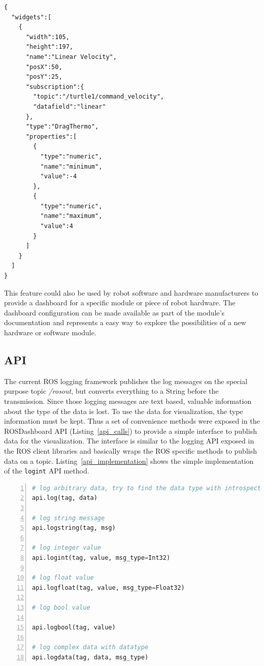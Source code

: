 \begin{lstlisting}[frame=single,caption={Example dashboard configuration in JSON.},label=json_example]
{
  "widgets":[
    {
      "width":105,
      "height":197,
      "name":"Linear Velocity",
      "posX":50,
      "posY":25,
      "subscription":{
        "topic":"/turtle1/command_velocity",
        "datafield":"linear"
      },
      "type":"DragThermo",
      "properties":[
        {
          "type":"numeric",
          "name":"minimum",
          "value":-4
        },
        {
          "type":"numeric",
          "name":"maximum",
          "value":4
        }
      ]
    }
  ]
}
\end{lstlisting}

This feature could also be used by robot software and hardware manufacturers to provide a dashboard for a specific module or piece of robot hardware. The dashboard configuration can be made available as part of the module's documentation and represents a easy way to explore the possibilities of a new hardware or software module.


\subsection{API}
\label{api_section}
The current ROS logging framework publishes the log messages on the special purpose topic \emph{/rosout}, but converts everything to a String before the transmission. Since those logging messages are text based, valuable information about the type of the data is lost. To use the data for visualization, the type information must be kept. Thus a set of convenience methods were exposed in the ROSDashboard API (Listing~\ref{api_calls}) to provide a simple interface to publish data for the visualization. The interface is similar to the logging API exposed in the ROS client libraries and basically wraps the ROS specific methods to publish data on a topic. Listing~\ref{api_implementation} shows the simple implementation of the \verb+logint+ API method.

\begin{lstlisting}[frame=single,caption={ROSDashboard API methods.},label=api_calls,language=Python,numbers=left,breaklines=true]
# log arbitrary data, try to find the data type with introspection
api.log(tag, data)

# log string message
api.logstring(tag, msg)

# log integer value
api.logint(tag, value, msg_type=Int32)

# log float value
api.logfloat(tag, value, msg_type=Float32)

# log bool value

api.logbool(tag, value)

# log complex data with datatype
api.logdata(tag, data, msg_type)
\end{lstlisting}

